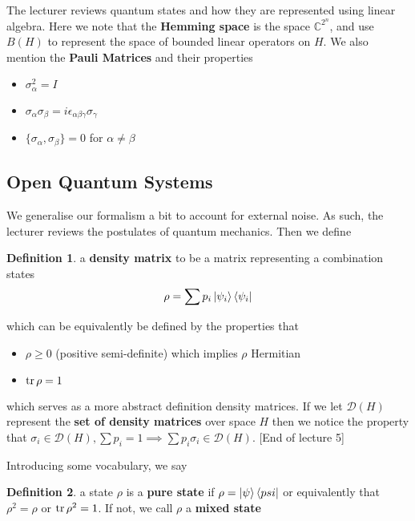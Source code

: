 \documentclass{article}
\theoremstyle{definition}
\newtheorem{definition}{Definition}
\begin{document}
The lecturer reviews quantum states and how they are represented using linear
algebra. Here we note that the \textbf{Hemming space} is the space
$\mathbb{C}^{2^n}$, and use $B(H)$ to represent the space of bounded linear
operators on $H$. We also mention the \textbf{Pauli Matrices} and their
properties

\begin{itemize}
\item $\sigma^2_\alpha = I$
\item $\sigma_\alpha \sigma_\beta = i\epsilon_{\alpha \beta \gamma}
  \sigma_\gamma$
\item $\{\sigma_\alpha, \sigma_\beta\} = 0$ for $\alpha \neq \beta$
\end{itemize}

\subsection{Open Quantum Systems}

We generalise our formalism a bit to account for external noise. As such, the
lecturer reviews the postulates of quantum mechanics. Then we define

\begin{definition}
  a \textbf{density matrix} to be a matrix representing a combination states
  \begin{equation}
    \rho = \sum p_i \ket{\psi_i} \bra{\psi_i}
  \end{equation}
\end{definition}

which can be equivalently be defined by the properties that

\begin{itemize}
\item $\rho \geq 0$ (positive semi-definite) which implies $\rho$ Hermitian
\item $\tr \rho = 1$
\end{itemize}

which serves as a more abstract definition density matrices. If we let
$\mathcal{D}(H)$ represent the \textbf{set of density matrices} over space $H$
then we notice the property that $\sigma_i \in \mathcal{D}(H), \sum p_i = 1
\implies \sum p_i \sigma_i \in \mathcal{D}(H).$ [End of lecture 5] 

Introducing some vocabulary, we say 

\begin{definition}
a state $\rho$ is a \textbf{pure state} if $\rho = \ket{\psi} \bra{psi}$ or
equivalently that $\rho^2 = \rho$ or $\tr \rho^2 = 1$. If not, we call $\rho$ a
\textbf{mixed state}
\end{definition}
\end{document}
